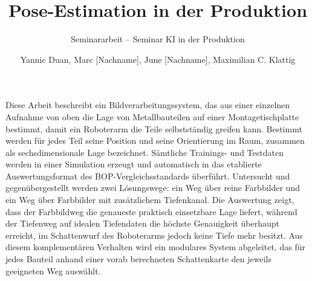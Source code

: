 \documentclass[oneside,studentpaper]{wbk}
\author{Yannic Duan, Marc [Nachname], June [Nachname], Maximilian C. Klattig}
\title{Pose-Estimation in der Produktion}
\subtitle{Seminararbeit -- Seminar \glqq KI in der Produktion\grqq}
\begin{document}

\maketitle

\ifDiss

	\begin{publisherpreface}
	\end{publisherpreface}

	\begin{authorpreface}
	\end{authorpreface}

\else

	\newpage
	\thispagestyle{empty}
	\quad  \addtocounter{page}{-1}
	\newpage


	\statementoforiginality

	\begin{acknowledgment}
	\end{acknowledgment}

	\begin{summary}
		Diese Arbeit beschreibt ein Bildverarbeitungssystem, das aus einer
		einzelnen Aufnahme von oben die Lage von Metallbauteilen auf einer
		Montagetischplatte bestimmt, damit ein Roboterarm die Teile selbstständig
		greifen kann. Bestimmt werden für jedes Teil seine Position und seine
		Orientierung im Raum, zusammen als sechsdimensionale Lage bezeichnet.
		Sämtliche Trainings- und Testdaten werden in einer Simulation erzeugt und
		automatisch in das etablierte Auswertungsformat des BOP-Vergleichsstandards
		überführt. Untersucht und gegenübergestellt werden zwei Lösungswege: ein
		Weg über reine Farbbilder und ein Weg über Farbbilder mit zusätzlichem
		Tiefenkanal. Die Auswertung zeigt, dass der Farbbildweg die genaueste
		praktisch einsetzbare Lage liefert, während der Tiefenweg auf idealen
		Tiefendaten die höchste Genauigkeit überhaupt erreicht, im Schattenwurf des
		Roboterarms jedoch keine Tiefe mehr besitzt. Aus diesem komplementären
		Verhalten wird ein modulares System abgeleitet, das für jedes Bauteil
		anhand einer vorab berechneten Schattenkarte den jeweils geeigneten Weg
		auswählt.
	\end{summary}
\fi
\end{document}
